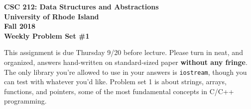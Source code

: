 \documentclass[11pt]{article}
\begin{document}
\thispagestyle{empty}

\begin{center}
    {\Large\bf CSC 212: Data Structures and Abstractions}\\
    \medskip
    {\Large\bf University of Rhode Island}\\
    \bigskip
    {\Large\bf Fall 2018}\\
    \bigskip
    {\Large\bf Weekly Problem Set \#1}
\end{center}

\vspace{25pt}

This assignment is due Thursday 9/20 before lecture.  Please turn in neat, and organized, answers hand-written on standard-sized paper {\bf without any fringe}. The only library you're allowed to use in your answers is \verb|iostream|, though you can test with whatever you'd like. Problem set 1 is about strings, arrays, functions, and pointers, some of the most fundamental concepts in C/C++ programming.
\end{document}
